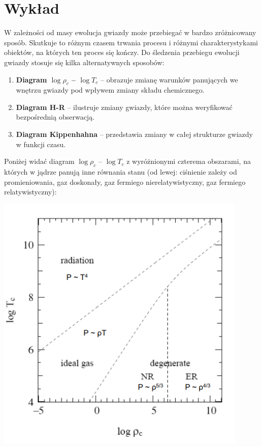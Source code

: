 \documentclass[../index.tex]{subfiles}
\begin{document}
    \section{Wykład}
        W zależności od masy ewolucja gwiazdy może przebiegać w bardzo zróżnicowany sposób. Skutkuje to różnym czasem trwania procesu i różnymi charakterystykami obiektów, na których ten proces się kończy. Do śledzenia przebiegu ewolucji gwiazdy stosuje się kilka alternatywnych sposobów:
        \begin{enumerate}
            \item \textbf{Diagram \(\log \rho_c\) – \(\log T_c\)} – obrazuje zmianę warunków panujących we wnętrzu gwiazdy pod wpływem zmiany składu chemicznego.
            \item \textbf{Diagram H-R} – ilustruje zmiany gwiazdy, które można weryfikować bezpośrednią obserwacją.
            \item \textbf{Diagram Kippenhahna} – przedstawia zmiany w całej strukturze gwiazdy w funkcji czasu.
        \end{enumerate}
        Poniżej widać diagram \(\log \rho_c\) – \(\log T_c\) z wyróżnionymi czterema obszarami, na których w jądrze panują inne równania stanu (od lewej: ciśnienie zależy od promieniowania, gaz doskonały, gaz fermiego nierelatywistyczny, gaz fermiego relatywistyczny):
        \begin{center}
            \includegraphics[width=12cm]{images/pustyLogRho_CT_C.png}
        \end{center}
\end{document}
